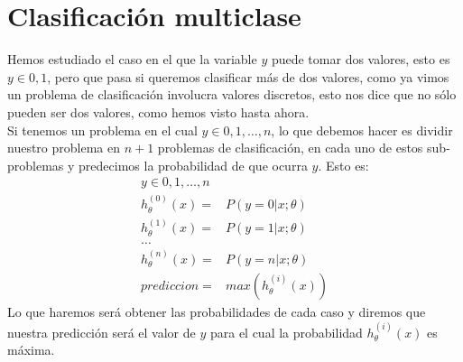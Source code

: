 \documentclass{report}
\begin{document}
\section{Clasificación multiclase}
Hemos estudiado el caso en el que la variable $ y $ puede tomar dos valores, esto es $ y\in{0,1} $, pero que pasa si queremos clasificar más de dos valores, como ya vimos un problema de clasificación involucra valores discretos, esto nos dice que no sólo pueden ser dos valores, como hemos visto hasta ahora.\\Si tenemos un problema en el cual $ y\in{0,1,\dots,n} $, lo que debemos hacer es dividir nuestro problema en $ n+1 $ problemas de clasificación, en cada uno de estos sub-problemas y predecimos la probabilidad de que ocurra $ y $. Esto es:
\begin{align*}
	y\in{0,1,\dots,n}\\
	h_\theta^{(0)}(x)=&P(y=0|x;\theta)\\
	h_\theta^{(1)}(x)=&P(y=1|x;\theta)\\
	\dots\\
	h_\theta^{(n)}(x)=&P(y=n|x;\theta)\\
	prediccion=&max(h_\theta^{(i)}(x))	
\end{align*}
Lo que haremos será obtener las probabilidades de cada caso y diremos que nuestra predicción será el valor de $ y $ para el cual la probabilidad $ h_\theta^{(i)}(x) $ es máxima.
\end{document}
